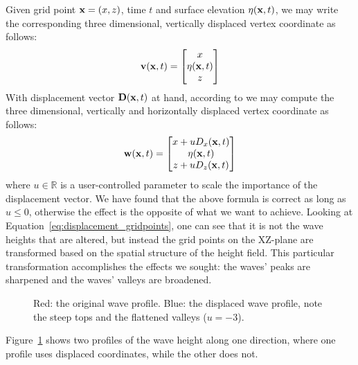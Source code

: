Given grid point $\mathbf{x} = (x,z)$, time $t$ and surface elevation $\eta(\mathbf{x},t)$, 
we may write the corresponding three dimensional, vertically displaced vertex 
coordinate as follows:
\begin{equation}
 \mathbf{v}(\mathbf{x},t) = \begin{bmatrix}x\\ \eta(\mathbf{x},t)\\ z\end{bmatrix} 
\end{equation}
With displacement vector $\mathbf{D}(\mathbf{x},t)$ at hand, according to 
\citet{course:simulatingocean} we may compute the three dimensional,
vertically and horizontally displaced vertex coordinate as follows:
\begin{equation}
\label{eq:displacement_gridpoints}
 \mathbf{w}(\mathbf{x},t) =
 \begin{bmatrix}
  x + u D_x(\mathbf{x},t)\\ 
  \eta(\mathbf{x},t)\\
  z + u D_z(\mathbf{x},t)
 \end{bmatrix}
\end{equation}
where $u\in\mathbb{R}$ is a user-controlled parameter to scale the importance of the
displacement vector. We have found that the above formula is correct as long as
$u \leq 0$, otherwise the effect is the opposite of what we want to achieve.
Looking at Equation~\ref{eq:displacement_gridpoints},
one can see that it is not the wave heights that are altered, but instead the grid
points on the XZ-plane are transformed based on the spatial structure of the
height field. This particular transformation accomplishes the effects we sought:
the waves' peaks are sharpened and the waves' valleys are broadened.
%
\begin{figure}
\centering
{}
\caption{Red: the original wave profile. Blue: the displaced wave profile, note 
the steep tops and the flattened valleys ($u = -3$).}
\label{fig:grid_displaced}
\end{figure}
%
Figure~\ref{fig:grid_displaced} shows two profiles of the wave height along one 
direction, where one profile uses displaced coordinates, while the other does 
not.
%
